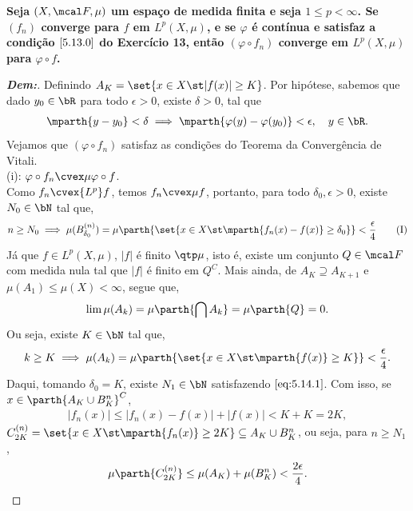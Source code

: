 \textbf{Seja $(X, \mcal F, \mu)$ um espaço de medida finita e seja $1 \le p < \infty$. 
Se $(f_n)$ converge para $f$ em $L^p(X, \mu)$, e se $\varphi$ é contínua 
e satisfaz a condição $\eqref{5.13.0}$ do Exercício 13, então $(\varphi \circ f_n)$
converge em $L^p(X, \mu)$ para $\varphi \circ f$.}
\begin{proof}[\textbf{Dem:}] Definindo $A_K = \set{x \in X \st |f(x)| \ge K}$. 
  Por hipótese, sabemos que dado $y_0 \in \bR$
  para todo $\epsilon>0$, existe $\delta > 0$, tal que 
  \begin{align*}
    \mparth{y - y_0}< \delta
    \implies \mparth{\varphi(y) -\varphi(y_0)}<\epsilon, \quad y \in \bR.
  \end{align*}
  Vejamos que $(\varphi \circ f_n)$ satisfaz 
  as condições do Teorema da Convergência de Vitali. \\ 
  (i): $\varphi \circ f_n \cvex \mu \varphi \circ f$.\\ 
  Como $f_n \cvex{L^p} f$, temos $f_n \cvex \mu f$, portanto, para todo 
  $\delta_0, \epsilon > 0$, existe $N_0 \in \bN$ tal que,
  \begin{align*}
    n \ge N_0 \implies  \mu(B_{\delta_0}^{(n)})= \mu\parth{\set{x \in X \st 
    \mparth{f_n(x) - f(x)}\ge \delta_0}}<\frac{\epsilon}{4}
    \tag{I}
    \label{eq:5.14.1}
  \end{align*}
  Já que $f \in L^p(X, \mu)$, $|f|$ é finito $\qtp \mu$, isto é, existe um 
  conjunto $Q \in \mcal F$ com medida nula tal que $|f|$ é finito em $Q^C$.
  Mais ainda, de $A_K \supseteq A_{K+1}$ e $\mu(A_1) \le \mu(X) < \infty$,
  segue que, 
  \begin{align*}
    \lim \mu(A_k) = \mu\parth{\bigcap A_k} = \mu\parth{Q} = 0.
  \end{align*}
  Ou seja, existe $K \in \bN$ tal que, 
  \begin{align*}
    k \ge K \implies \mu(A_k) 
    = \mu\parth{\set{x \in X \st \mparth{f(x)}\ge K}} < \frac{\epsilon}{4}.
  \end{align*}
  Daqui, tomando $\delta_0 = K$, existe $N_1 \in \bN$
  satisfazendo $\eqref{eq:5.14.1}$. Com isso, se $x \in \parth{A_K \cup B_{K}^{n}}^C$,
  \begin{align*}
    |f_n(x)| \le |f_n(x) - f(x)| + |f(x)| < K + K = 2K,
  \end{align*}
  $C_{2K}^{(n)} = \set{x \in X \st \mparth{f_n(x)}\ge 2K} \subseteq A_K \cup B_{K}^{n}$,
  ou seja, para $n \ge N_1$,
  \begin{align*}
    \mu\parth{C^{(n)}_{2K}} \le \mu(A_K) + \mu(B_K^{n}) < \frac{2\epsilon}{4}.

\end{align*}
\end{proof}
